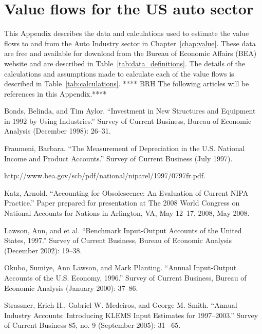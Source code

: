 %
%
%
\chapter{Value flows for the US auto sector}
\label{chap:auto_value_flows} 


This Appendix describes the data and calculations used to estimate the value flows to and from the Auto Industry sector in Chapter~\ref{chap:value}. These data are free and available for download from the Bureau of Economic Affairs (BEA) website
and are described in Table~\ref{tab:data_definitions}. The details of the calculations and assumptions made to calculate 
each of the value flows is described in 
Table~\ref{tab:calculations}. **** BRH The following articles will be references in this Appendix.****

Bonds, Belinda, and Tim Aylor. “Investment in New Structures and Equipment in 1992 by Using Industries.” Survey of Current Business, Bureau of Economic Analysis (December 1998): 26–31.

Fraumeni, Barbara. “The Measurement of Depreciation in the U.S. National Income and Product Accounts.” Survey of Current Business (July 1997). 

http://www.bea.gov/scb/pdf/national/niparel/1997/0797fr.pdf.

Katz, Arnold. “Accounting for Obsolescence: An Evaluation of Current NIPA Practice.” Paper prepared for presentation at The 2008 World Congress on National Accounts for Nations  in Arlington, VA, May 12--17, 2008, May 2008.

Lawson, Ann, and et al. “Benchmark Input-Output Accounts of the United States,  1997.” Survey of Current Business, Bureau of Economic Analysis (December 2002): 19–38.

Okubo, Sumiye, Ann Lawson, and Mark Planting. “Annual Input-Output Accounts of the U.S. Economy, 1996.” Survey of Current Business, Bureau of Economic Analysis (January 2000): 37–86.

Strassner, Erich H., Gabriel W. Medeiros, and George M. Smith. “Annual Industry Accounts: Introducing KLEMS Input Estimates for 1997--2003.” Survey of Current Business 85, no. 9 (September 2005): 31–-65.



